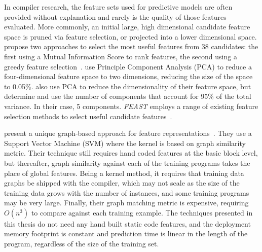 In compiler research, the feature sets used for predictive models are often provided without explanation and rarely is the quality of those features evaluated. More commonly, an initial large, high dimensional candidate feature space is pruned via feature selection, or projected into a lower dimensional space.
\citeauthor{Stephenson2005} propose two approaches to select the most useful features from 38 candidates: the first using a Mutual Information Score to rank features, the second using a greedy feature selection~\cite{Stephenson2005}.
\citeauthor{Collins2013} use Principle Component Analysis (PCA) to reduce a four-dimensional feature space to two dimensions, reducing the size of the space to 0.05\%.
\citeauthor{Dubach2007} also use PCA to reduce the dimensionality of their feature space, but determine and use the number of components that account for 95\% of the total variance. In their case, 5 components.
\emph{FEAST} employs a range of existing feature selection methods to select useful candidate features~\cite{Ting2016}.

\citeauthor{Park2012} present a unique graph-based approach for feature representations~\cite{Park2012}. They use a Support Vector Machine (SVM) where the kernel is based on graph similarity metric. Their technique still requires hand coded features at the basic block level, but thereafter, graph similarity against each of the training programs takes the place of global features. Being a kernel method, it requires that training data graphs be shipped with the compiler, which may not scale as the size of the training data grows with the number of instances, and some training programs may be very large. Finally, their graph matching metric is expensive, requiring $O(n^3)$ to compare against each training example. The techniques presented in this thesis do not need any hand built static code features, and the deployment memory footprint is constant and prediction time is linear in the length of the program, regardless of the size of the training set.

